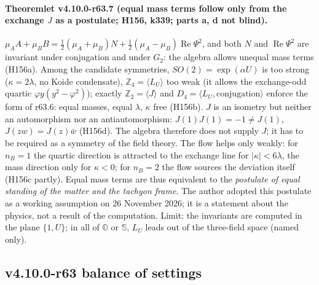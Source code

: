 \paragraph{Theoremlet v4.10.0-r63.7 (equal mass terms follow only from the exchange \(J\) as a postulate; H156, k339; parts a, d not blind).}
\(\mu_AA+\mu_BB=\tfrac12(\mu_A+\mu_B)N+\tfrac12(\mu_A-\mu_B)\operatorname{Re}\Psi^2\), and both \(N\) and \(\operatorname{Re}\Psi^2\) are invariant
under conjugation and under \(G_2\): the algebra allows unequal mass terms (H156a).  Among the candidate symmetries, \(SO(2)=\exp(\alpha U)\) is
too strong (\(\kappa=2\lambda\), no Koide condensate), \(\mathbb Z_4=\langle L_U\rangle\) too weak (it allows the exchange-odd quartic
\(\varphi y(y^2-\varphi^2)\)); exactly \(\mathbb Z_2=\langle J\rangle\) and \(D_4=\langle L_U,\text{conjugation}\rangle\) enforce the form of
r63.6: equal masses, equal \(\lambda\), \(\kappa\) free (H156b).  \(J\) is an isometry but neither an automorphism nor an antiautomorphism:
\(J(1)J(1)=-1\ne J(1)\), \(J(zw)=J(z)\bar w\) (H156d).  The algebra therefore does not supply \(J\); it has to be required as a symmetry of the
field theory.  The flow helps only weakly: for \(n_B=1\) the quartic direction is attracted to the exchange line for \(|\kappa|<6\lambda\), the
mass direction only for \(\kappa<0\); for \(n_B=2\) the flow sources the deviation itself (H156c partly).  Equal mass terms are thus equivalent to
the \emph{postulate of equal standing of the matter and the tachyon frame}.  The author adopted this postulate as a working assumption on
26 November 2026; it is a statement about the physics, not a result of the computation.  Limit: the invariants are computed in the plane
\(\{1,U\}\); in all of \(\mathbb O\) or \(\mathbb S\), \(L_U\) leads out of the three-field space (named only).

\subsection*{v4.10.0-r63 balance of settings}
\label{subsec:v4100-r63-balance}


